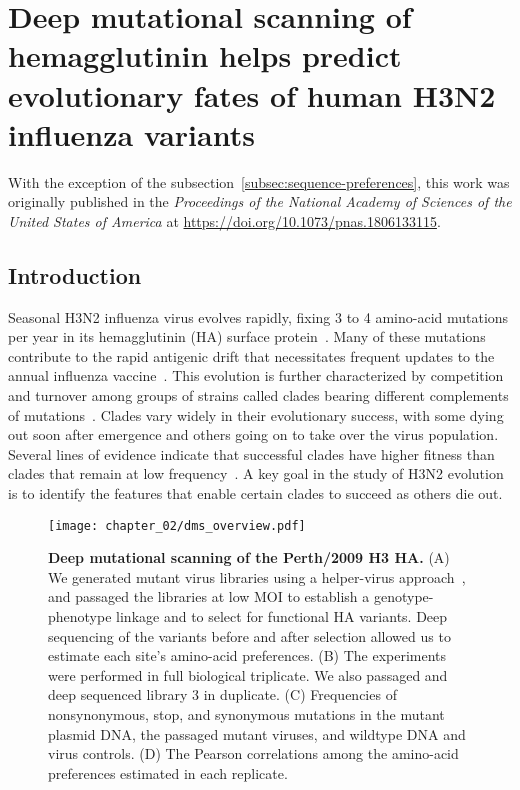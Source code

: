\chapter{Deep mutational scanning of hemagglutinin helps predict evolutionary fates of human H3N2 influenza variants}

With the exception of the subsection~\ref{subsec:sequence-preferences}, this work was originally published in the \emph{Proceedings of the National Academy of Sciences of the United States of America} at \url{https://doi.org/10.1073/pnas.1806133115}.

\section{Introduction}

Seasonal H3N2 influenza virus evolves rapidly, fixing 3 to 4 amino-acid mutations per year in its hemagglutinin (HA) surface protein~\citep{fitch1997long, bhatt2011genomic}.
Many of these mutations contribute to the rapid antigenic drift that necessitates frequent updates to the annual influenza vaccine~\citep{Smith:2004jc}.
This evolution is further characterized by competition and turnover among groups of strains called clades bearing different complements of mutations~\citep{bedford2011,strelkowa2012clonal,Neher:2014eu,Koelle:2015dh,Bedford:2015fj}.
Clades vary widely in their evolutionary success, with some dying out soon after emergence and others going on to take over the virus population.
Several lines of evidence indicate that successful clades have higher fitness than clades that remain at low frequency~\citep{bedford2011,strelkowa2012clonal,Neher:2014eu,Luksza:2014hj}.
A key goal in the study of H3N2 evolution is to identify the features that enable certain clades to succeed as others die out.

\begin{figure}
  \centering
  \texttt{[image: chapter\_02/dms\_overview.pdf]}
  \caption[{Deep mutational scanning of the Perth/2009 H3 HA.}]{\label{fig:dms_overview}
    {\bf Deep mutational scanning of the Perth/2009 H3 HA.}
    (A) We generated mutant virus libraries using a helper-virus approach~\citep{Doud:2016gm}, and passaged the libraries at low MOI to establish a genotype-phenotype      linkage and to select for functional HA variants.
    Deep sequencing of the variants before and after selection allowed us to estimate each site's amino-acid preferences.
    (B) The experiments were performed in full biological triplicate.
    We also passaged and deep sequenced library 3 in duplicate.
    (C) Frequencies of nonsynonymous, stop, and synonymous mutations in the mutant plasmid DNA, the passaged mutant viruses, and wildtype DNA and virus controls.
    (D) The Pearson correlations among the amino-acid preferences estimated in each replicate.
  }
\end{figure}


